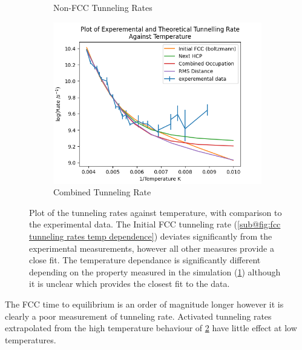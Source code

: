 \begin{figure}[htbp]
\begin{subfigure}{0.3\linewidth}
        \caption{Non-FCC Tunneling Rates
        }\label{sub@fig:other tunneling rates temp dependence}
    \end{subfigure}
    \hfill
    \begin{subfigure}{0.3\linewidth}
        \centering
        \includegraphics[width = 0.9\linewidth]{Figures/Redfield/Plot of redfield temperature dependance close points corrected.png}
        \caption{Combined Tunneling Rate
        }\label{sub@fig:rates with activated tunneling}
    \end{subfigure}
    \caption{Plot of the tunneling
        rates against temperature, with comparison
        to the experimental data.
        The Initial FCC tunneling rate
        (\cref{sub@fig:fcc tunneling rates temp dependence})
        deviates significantly from the experimental
        measurements, however all other measures
        provide a close fit.
        The temperature dependance
        is significantly different
        depending on the
        property measured
        in the simulation
        (\cref{sub@fig:other tunneling rates temp dependence})
        although it is unclear
        which provides the
        closest fit to the data.
    }\label{fig:tunneling rate against temperature}
\end{figure}
The FCC time to
equilibrium is
an order of magnitude longer however
it is clearly a poor measurement of
tunneling rate. Activated
tunneling rates extrapolated
from the
high temperature behaviour of
\cref{sub@fig:rates with activated tunneling}
have little effect at low temperatures.